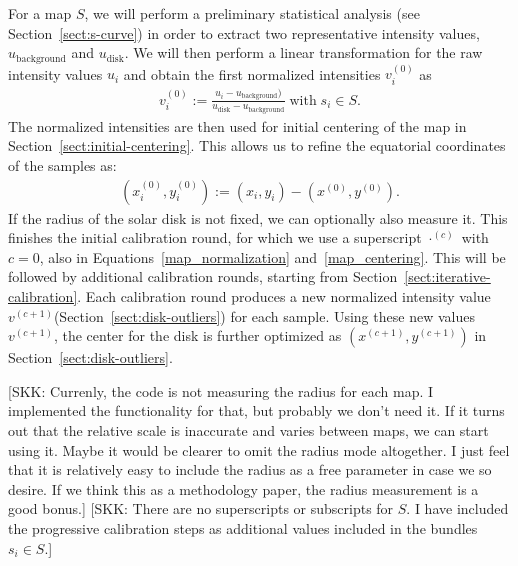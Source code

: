 \documentclass{aa}
\newcommand{\skk}[1]{\textcolor{midorange}{[SKK: #1]}} %
\newcommand{\eqnl}[2]{\begin{eqnarray}\label{#1}#2\end{eqnarray}}
\newcommand{\s}[2]{{#1}_{\mathrm{#2}}}
\begin{document}
  For a map $S$, we will perform a preliminary statistical analysis (see Section~\ref{sect:s-curve}) in order to extract 
  two representative intensity values, $\s{u}{background}$ and $\s{u}{disk}$. We will then perform a linear 
  transformation for the raw intensity values $u_i$ and obtain the first normalized intensities $v_i^{(0)}$ as
  \eqnl{map_normalization}{
  v_i^{(0)} := \frac{u_i - \s{u}{background})}{\s{u}{disk} - \s{u}{background}} \; \text{with} \; s_i \in S \text{.}
  }
  The normalized intensities are then used for initial centering of the map in Section~\ref{sect:initial-centering}. 
  This allows us to refine the equatorial coordinates of the samples as:
  \eqnl{map_centering}{
  \left( x_i^{(0)}, y_i^{(0)} \right) := \left( x_i, y_i \right) - \left( x^{(0)}, y^{(0)} \right) \text{.}
  }
  If the radius of the solar disk is not fixed, we can optionally also measure it. This finishes the initial calibration 
  round, for which we use a superscript $\cdot^{(c)}$ with $c=0$, also in Equations~\ref{map_normalization} 
  and~\ref{map_centering}. This will be followed by additional calibration rounds, starting from 
  Section~\ref{sect:iterative-calibration}. Each calibration round produces a new normalized intensity value 
  $v^{(c+1)}$(Section~\ref{sect:disk-outliers}) for each sample. Using these new values $v^{(c+1)}$, the center for the 
  disk is further optimized as $(x^{(c+1)}, y^{(c+1)})$ in Section~\ref{sect:disk-outliers}.

  \skk{Currenly, the code is not measuring the radius for each map. I implemented the functionality for 
  that, but probably we don't need it. If it turns out that the relative scale is inaccurate and varies between maps, we 
  can start using it. Maybe it would be clearer to omit the radius mode altogether. I just feel that it is relatively 
  easy to include the radius as a free parameter in case we so desire. If we think this as a methodology paper, the 
  radius measurement is a good bonus.}  
  \skk{There are no superscripts or subscripts for $S$. I have included the progressive calibration steps as additional 
  values included in the bundles $s_i\in S$.}
  
\end{document}
